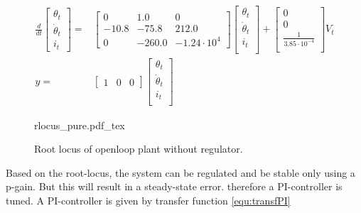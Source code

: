 \documentclass[../../../Main]{subfiles}
\begin{document}
\begin{equation}
      \begin{split}
      \label{eq:zero_linearized}
      \frac{d}{dt}
    \begin{bmatrix}
        \theta_t \\
        \dot \theta_t \\
        i_t
    \end{bmatrix}
    =&
    \begin{bmatrix}0 & 1.0 & 0\\ -10.8 & -75.8 & 212.0\\ 0 & -260.0 & -1.24\cdot10^{4}\end{bmatrix}
    \begin{bmatrix}
        \theta_t \\
        \dot \theta_t \\
        i_t \\
    \end{bmatrix}
    +
    \begin{bmatrix}
        0 \\
        0 \\
	\frac{1}{3.85\cdot10^{-4}}\\
    \end{bmatrix}
    V_t
\\
      y =&
    \begin{bmatrix}
        1 & 0 & 0
    \end{bmatrix}
    \begin{bmatrix}
        \theta_t \\
        \dot \theta_t\\
        i_t\\
    \end{bmatrix}
    \end{split}
\end{equation}

\begin{figure}[H]
\centering
\def\svgwidth{\textwidth}
{rlocus_pure.pdf_tex}
\caption{Root locus of openloop plant without regulator.}
\label{fig:rlocus_pure}
\end{figure}

Based on the root-locus, the system can be regulated and be stable only using a p-gain.
But this will result in a steady-state error. therefore a PI-controller is tuned.
A PI-controller is given by transfer function \eqref{equ:transfPI}
\end{document}

